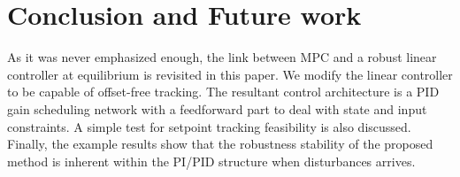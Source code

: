 \documentclass[5p,authoryear,times]{elsarticle}
\begin{document}
\section{Conclusion and Future work}

As it was never emphasized enough, the link between MPC and a robust linear controller at equilibrium is revisited in this paper. We modify the linear controller to be capable of offset-free tracking. The resultant control architecture is a PID gain scheduling network with a feedforward part to deal with state and input constraints. A simple test for setpoint tracking feasibility is also discussed. Finally, the example results show that the robustness stability of the proposed method is inherent within the PI/PID structure when disturbances arrives.





\end{document}
